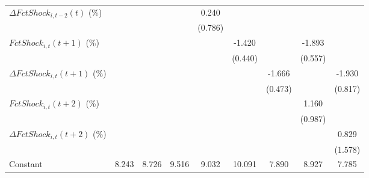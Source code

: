{\begin{tabular}{l*{8}{c}}
\addlinespace
$ \Delta FctShock_{i,t-2}(t)$ (\%)&                     &                     &                     &       0.240         &                     &                     &                     &                     \\
                    &                     &                     &                     &     (0.786)         &                     &                     &                     &                     \\
\addlinespace
$ FctShock_{i,t}(t+1)$ (\%)&                     &                     &                     &                     &      -1.420\sym{***}&                     &      -1.893\sym{***}&                     \\
                    &                     &                     &                     &                     &     (0.440)         &                     &     (0.557)         &                     \\
\addlinespace
$ \Delta FctShock_{i,t}(t+1)$ (\%)&                     &                     &                     &                     &                     &      -1.666\sym{***}&                     &      -1.930\sym{**} \\
                    &                     &                     &                     &                     &                     &     (0.473)         &                     &     (0.817)         \\
\addlinespace
$ FctShock_{i,t}(t+2)$ (\%)&                     &                     &                     &                     &                     &                     &       1.160         &                     \\
                    &                     &                     &                     &                     &                     &                     &     (0.987)         &                     \\
\addlinespace
$ \Delta FctShock_{i,t}(t+2)$ (\%)&                     &                     &                     &                     &                     &                     &                     &       0.829         \\
                    &                     &                     &                     &                     &                     &                     &                     &     (1.578)         \\
\addlinespace
Constant            &       8.243\sym{***}&       8.726\sym{***}&       9.516\sym{***}&       9.032\sym{***}&      10.091\sym{***}&       7.890\sym{***}&       8.927\sym{***}&       7.785\sym{***}\\

\end{tabular}}
